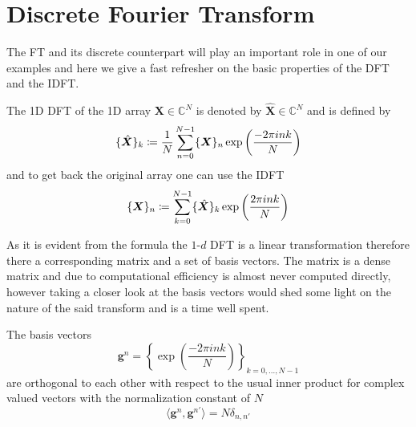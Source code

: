 \section{Discrete Fourier Transform}
The \ac{FT} and its discrete counterpart will play an important role in one of our examples and here we give a fast refresher on the basic properties of the \ac{DFT} and the \ac{IDFT}.

\begin{Def}[1D \ac{DFT}]\label{def:1ddft}
    The 1D \ac{DFT}  of the 1D array $\boldsymbol{X} \in \mathbb{C}^{N}$ is denoted by 
    $\hat {\boldsymbol{X}} \in \mathbb{C}^{N}$ and is defined by
    \begin{equation}\label{eq:1ddft}
        \{\hat {\boldsymbol{X}}\}_{k} \coloneqq \frac{1}{N}\sum_{n=0}^{N-1} \{{\boldsymbol{X}}\}_{n}\exp\left({\frac{-2\pi ink}{N}}\right)\index{\ac{FT}!$1$-$d$ \ac{DFT}}
    \end{equation}
    and to get back the original array one can use the \ac{IDFT} 
    \begin{equation}\label{eq:1didft}
        \{{\boldsymbol{X}}\}_{n} \coloneqq \sum_{k=0}^{N-1}\{\hat {\boldsymbol{X}}\}_{k}\exp\left({\frac{2\pi ink}{N}}\right)\index{\ac{FT}!$1$-$d$ \ac{IDFT}}
    \end{equation}    
\end{Def}

As it is evident from the formula the $1$-$d$ \ac{DFT} is a linear transformation therefore there a corresponding matrix 
and a set of basis vectors. The matrix is a dense matrix\cite{Frazier1999}\cite{Cormen2022} and due to computational 
efficiency\cite{Frazier1999}\cite{Cormen2022} is almost never computed directly, however taking a closer look at the 
basis vectors would shed some light on the nature of the said transform and is a time well spent.

\begin{Prop}\label{Prop:1ddftbasisvectors}
    The basis vectors
    \begin{equation}\label{eq:1ddftbasisvectors}
        \boldsymbol{g}^n = \left\{\exp\left({\frac{-2\pi ink}{N}}\right)\right\}_{k=0,\ldots,N-1}
    \end{equation}
    are orthogonal to each other with respect to the usual inner product for complex valued vectors 
    with the normalization constant of $N$
    \begin{equation}
        \langle\boldsymbol{g}^n,\boldsymbol{g}^{n'}\rangle= N \delta_{n,n'}
    \end{equation}
\end{Prop}

